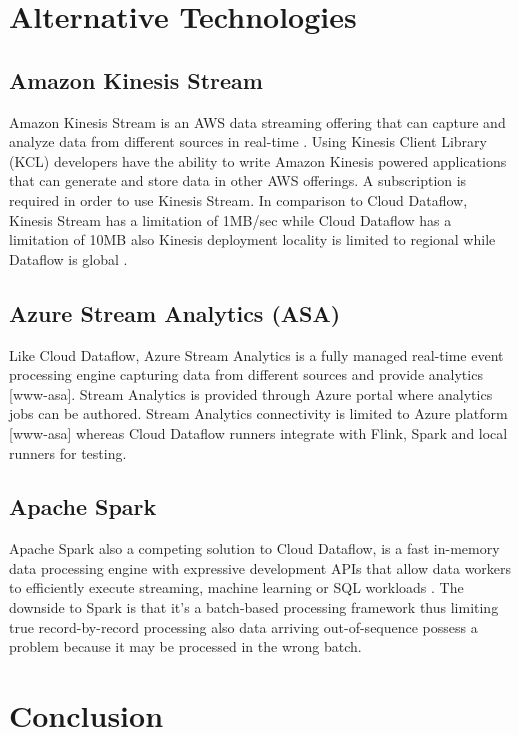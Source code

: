 \documentclass[9pt,twocolumn,twoside]{styles/osajnl}
\newcommand{\TODO}[2][]{\todo[color=red!10,inline,#1]{#2}}
\begin{document}
\section{Alternative Technologies}

\subsection{Amazon Kinesis Stream}

Amazon Kinesis Stream is an AWS data streaming offering that can
capture and analyze data from different sources in real-time
\cite{www-kinesis}. Using Kinesis Client Library (KCL) developers have
the ability to write Amazon Kinesis powered applications that can
generate and store data in other AWS offerings. A subscription is
required in order to use Kinesis Stream. In comparison to Cloud
Dataflow, Kinesis Stream has a limitation of 1MB/sec while Cloud
Dataflow has a limitation of 10MB also Kinesis deployment locality is
limited to regional while Dataflow is global \cite{www-awscomparison}.

\subsection{Azure Stream Analytics (ASA)}
\TODO{
Reference tag missing [www-asa].
}
Like Cloud Dataflow, Azure Stream Analytics is a fully managed
real-time event processing engine capturing data from different
sources and provide analytics [www-asa]. Stream Analytics is provided
through Azure portal where analytics jobs can be authored. Stream
Analytics connectivity is limited to Azure platform [www-asa] whereas
Cloud Dataflow runners integrate with Flink, Spark and local runners
for testing.

\subsection{Apache Spark}

Apache Spark also a competing solution to Cloud Dataflow, is a fast
in-memory data processing engine with expressive development APIs that
allow data workers to efficiently execute streaming, machine learning
or SQL workloads \cite{www-spark}. The downside to Spark is that it’s
a batch-based processing framework \cite{www-notstream} thus limiting
true record-by-record processing also data arriving out-of-sequence
possess a problem because it may be processed in the wrong batch.

\section{Conclusion}
\end{document}
